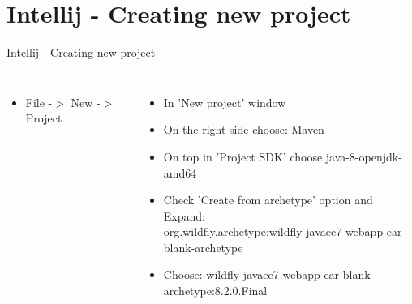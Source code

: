 \documentclass[aspectratio=1610,english]{beamer} %
\begin{document}
  	\section{Intellij - Creating new project}
	\begin{frame}{Intellij - Creating new project}
		\begin{columns}
				\begin{itemize}
					\tiny
					\color{black}
					\item File -$>$ New -$>$ Project
				\end{itemize}
				
				\begin{minipage}{\textwidth}
				\end{minipage}
				
				\begin{itemize}
					\tiny
					\color{black}
					\item In 'New project' window \\ 
					\item On the right side choose: Maven
					\item On top in 'Project SDK' choose java-8-openjdk-amd64
					\item Check 'Create from archetype' option and Expand: \\ 
					\color{gray}
						org.wildfly.archetype:wildfly-javaee7-webapp-ear-blank-archetype 
					\color{black}
					\item Choose: 
						\color{gray}
						wildfly-javaee7-webapp-ear-blank-archetype:8.2.0.Final 
				\end{itemize}
				

\end{columns}
\end{frame}
\end{document}
